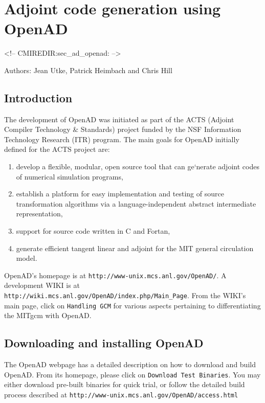 \section{Adjoint code generation using OpenAD}
\label{sec_ad_openad}
\begin{rawhtml}
<!-- CMIREDIR:sec_ad_openad: -->
\end{rawhtml}

Authors: Jean Utke, Patrick Heimbach and Chris Hill

\subsection{Introduction}

The development of OpenAD was initiated as part of the
ACTS (Adjoint Compiler Technology \& Standards) project funded  by the NSF Information Technology Research (ITR) program. 
The main goals for OpenAD initially defined for the  ACTS project are:
%
\begin{enumerate}
%
\item
develop a flexible, modular, open source tool that can ge`nerate adjoint codes of numerical simulation programs, 
%
\item
establish a platform for easy implementation and testing of source transformation algorithms via a language-independent abstract intermediate representation,
%
\item
support for source code written in C and Fortan,
%
\item
generate efficient tangent linear and adjoint for the 
MIT general circulation model.
%
\end{enumerate}

OpenAD's homepage is at \texttt{http://www-unix.mcs.anl.gov/OpenAD/}.
A development WIKI is at 
\texttt{http://wiki.mcs.anl.gov/OpenAD/index.php/Main\_Page}.
From the WIKI's main page, click on \texttt{Handling GCM} for
various aspects pertaining to differentiating the MITgcm with OpenAD.

\subsection{Downloading and installing OpenAD}

The OpenAD webpage has a detailed description on how to download and
build OpenAD. From its homepage, please click on 
\texttt{Download Test Binaries}.
You may either download pre-built binaries for quick trial,
or follow the detailed build process described at
\texttt{http://www-unix.mcs.anl.gov/OpenAD/access.html}

